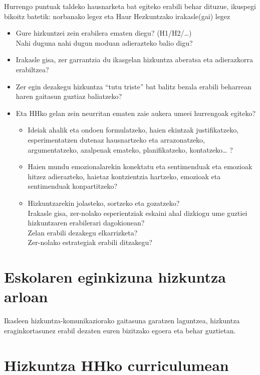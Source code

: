 \documentclass[
]{book}
\providecommand{\tightlist}{%
  \setlength{\itemsep}{0pt}\setlength{\parskip}{0pt}}
\begin{document}
Hurrengo puntuak taldeko hausnarketa bat egiteko erabili behar dituzue, ikuspegi bikoitz batetik: norbanako legez eta Haur Hezkuntzako irakasle(gai) legez

\begin{itemize}
\tightlist
\item
  Gure hizkuntzei zein erabilera ematen diegu? (H1/H2/\ldots)\\
  Nahi duguna nahi dugun moduan adierazteko balio digu?
\item
  Irakasle gisa, zer garrantzia du ikasgelan hizkuntza aberatsa eta adierazkorra erabiltzea?
\item
  Zer egin dezakegu hizkuntza ``tutu triste'' bat balitz bezala erabili beharrean haren gaitasun guztiaz baliatzeko?
\item
  Eta HHko gelan zein neurritan ematen zaie aukera umeei hurrengoak egiteko?

  \begin{itemize}
  \tightlist
  \item
    Ideiak ahalik eta ondoen formulatzeko, haien ekintzak justifikatzeko, esperimentatzen dutenaz hausnartzeko eta arrazonatzeko, argumentatzeko, azalpenak emateko, planifikatzeko, kontatzeko\ldots{} ?
  \item
    Haien mundu emozionalarekin konektatu eta sentimenduak eta emozioak hitzez adierazteko, haietaz kontzientzia hartzeko, emozioak eta sentimenduak konpartitzeko?
  \item
    Hizkuntzarekin jolasteko, sortzeko eta gozatzeko?\\
    Irakasle gisa, zer-nolako esperientziak eskaini ahal dizkiogu ume guztiei hizkuntzaren erabilerari dagokionean?\\
    Zelan erabili dezakegu elkarrizketa?\\
    Zer-nolako estrategiak erabili ditzakegu?
  \end{itemize}
\end{itemize}

\hypertarget{eskolaren-eginkizuna-hizkuntza-arloan}{%
\section{Eskolaren eginkizuna hizkuntza arloan}\label{eskolaren-eginkizuna-hizkuntza-arloan}}

Ikasleen hizkuntza-komunikaziorako gaitasuna garatzen laguntzea, hizkuntza eraginkortasunez erabil dezaten euren bizitzako egoera eta behar guztietan.

\hypertarget{hizkuntza-hhko-curriculumean}{%
\section{Hizkuntza HHko curriculumean}\label{hizkuntza-hhko-curriculumean}}
\end{document}
